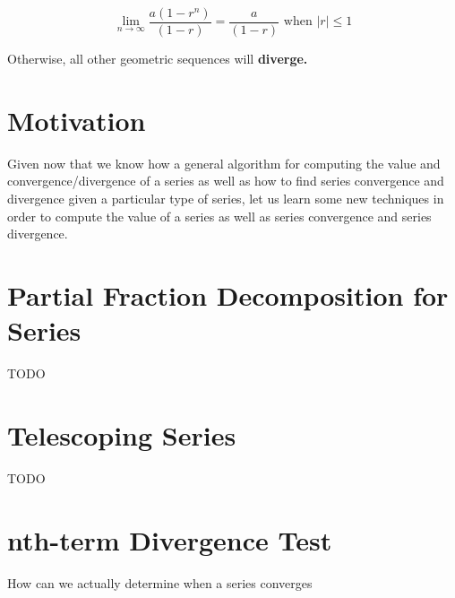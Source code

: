 \documentclass{report}
\newtheorem{thm}{Theorem}
\begin{document}
\begin{sloppypar}
\[ \lim_{n \rightarrow \infty} \frac{a(1-r^{n})}{(1-r)} = \frac{a}{(1-r)} \textrm{ when $|r| \leq 1 $} \]

Otherwise, all other geometric sequences will \textbf{diverge.}


\section{Motivation}
Given now that we know how a general algorithm for computing the value and convergence/divergence
of a series as well as how to find series convergence and divergence given a particular type
of series, let us learn some new techniques in order to compute the value of a series
as well as series convergence and series divergence.

\section{Partial Fraction Decomposition for Series}
TODO

\section{Telescoping Series}
TODO

\section{nth-term Divergence Test}
How can we actually determine when a series converges
\begin{center}
\end{center}

\begin{center}
\end{center}



\end{sloppypar}
\end{document}
